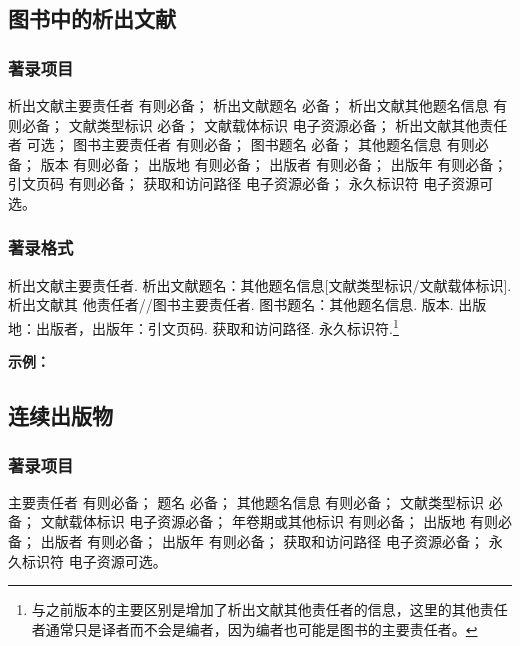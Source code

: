 \documentclass[twoside]{article}%
\begin{document}
\subsection{图书中的析出文献}\label{sec:entrytype:inbook}

\subsubsection{著录项目}

析出文献主要责任者 有则必备；
析出文献题名 必备；
析出文献其他题名信息 有则必备；
文献类型标识 必备；
文献载体标识 电子资源必备；
析出文献其他责任者 可选；
图书主要责任者 有则必备；
图书题名 必备；
其他题名信息 有则必备；
版本 有则必备；
出版地 有则必备；
出版者 有则必备；
出版年 有则必备；
引文页码 有则必备；
获取和访问路径 电子资源必备；
永久标识符 电子资源可选。

\subsubsection{著录格式}

析出文献主要责任者. 析出文献题名：其他题名信息[文献类型标识/文献载体标识]. 析出文献其
他责任者//图书主要责任者. 图书题名：其他题名信息. 版本. 出版地：出版者，出版年：引文页码.
获取和访问路径. 永久标识符.\footnote{与之前版本的主要区别是增加了析出文献其他责任者的信息，这里的其他责任者通常只是译者而不会是编者，因为编者也可能是图书的主要责任者。}

\begin{refsection}

\nocite{1988-590-590,
阿扬2023,
王夫之2011-1109-1109,
程根伟1999-32-36,
陈晋镳1980-56-114a,
马克思2013-302-302,
楼梦麟2011-11-12,
Weinstein1974-745-772,
Roberson2011-1-36}


\textbf{示例：}

{\printbibliography[heading=none,env=indentegenv]}
\end{refsection}

\subsection{连续出版物}

\subsubsection{著录项目}

主要责任者 有则必备；
题名 必备；
其他题名信息 有则必备；
文献类型标识 必备；
文献载体标识 电子资源必备；
年卷期或其他标识 有则必备；
出版地 有则必备；
出版者 有则必备；
出版年 有则必备；
获取和访问路径 电子资源必备；
永久标识符 电子资源可选。
\end{document}
